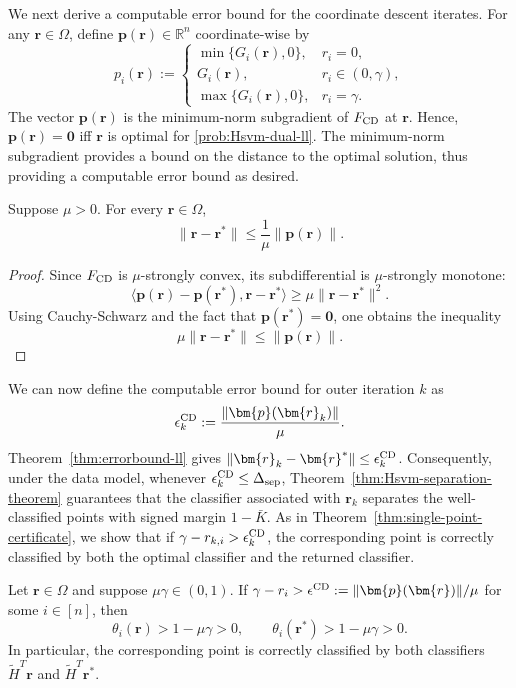 \documentclass[twoside,11pt]{article}
\newcommand\bz{\bm{0}}
\newcommand{\R}{{\mathbb{R}}} %
\newcommand\p{\bm{p}}
\renewcommand\r{\bm{r}}
\newcommand\tH{\tilde{H}}
\newcommand\sep{\mathrm{sep}}
\begin{document}
    We next derive a computable error bound for the coordinate descent iterates. For any $\r \in \Omega$, define $\p(\r) \in \R^n$ coordinate-wise by
    \begin{equation} \label{eqn:min-norm-subg}
        p_i(\r) := \begin{cases}
            \min\{G_i(\r),0\}, & r_i=0,\\
            G_i(\r), & r_i \in (0,\gamma),\\
            \max\{G_i(\r),0\}, & r_i=\gamma.
        \end{cases}
    \end{equation}
    The vector $\p(\r)$ is the minimum-norm subgradient of $F_{\rm CD}$ at $\r$. Hence, $\p(\r) = \bz$ iff $\r$ is optimal for \eqref{prob:Hsvm-dual-ll}. The minimum-norm subgradient provides a bound on the distance to the optimal solution, thus providing a computable error bound as desired.
    \begin{theorem} \label{thm:errorbound-ll}
        Suppose $\mu > 0$. For every $\r \in \Omega$,
        \[
            \|\r - \r^*\| \leq \frac{1}{\mu}\|\p(\r)\|.
        \]
    \end{theorem}
    \begin{proof}
        Since $F_{\rm CD}$ is $\mu$-strongly convex, its subdifferential is $\mu$-strongly monotone:
        \[
            \langle{\p(\r) - \p(\r^*), \r - \r^*}\rangle \geq \mu\|\r - \r^*\|^2.
        \]
        Using Cauchy-Schwarz and the fact that $\p(\r^*) = \bz$, one obtains the inequality
        \[
            \mu\|\r - \r^*\| \leq \|\p(\r)\|.
        \]
    \end{proof}
    We can now define the computable error bound for outer iteration $k$ as \[
        \epsilon_k^{\rm CD} := \frac{\|\p(\r_k)\|}{\mu}.
    \]
    Theorem~\ref{thm:errorbound-ll} gives $\|\r_k - \r^*\| \leq \epsilon^{\rm CD}_k$. Consequently, under the data model, whenever $\epsilon_k^{\rm CD} \leq \Delta_{\sep}$, Theorem~\ref{thm:Hsvm-separation-theorem} guarantees that the classifier associated with $\r_k$ separates the well-classified points with signed margin $1 - \bar{K}$. As in Theorem~\ref{thm:single-point-certificate}, we show that if $\gamma - r_{k,i} > \epsilon_k^{\rm CD}$, the corresponding point is correctly classified by both the optimal classifier and the returned classifier.
    \begin{theorem}
        Let $\r \in \Omega$ and suppose $\mu\gamma \in (0,1)$. If $\gamma - r_i > \epsilon^{\rm CD} := \|\p(\r)\|/\mu$ for some $i \in [n]$, then
        \[
            \theta_i(\r)>1-\mu\gamma > 0, \qquad \theta_i(\r^*)>1-\mu\gamma>0.
        \]
        In particular, the corresponding point is correctly classified by both classifiers $\tH^T\r$ and $\tH^T\r^*$.
    \end{theorem}
\end{document}
